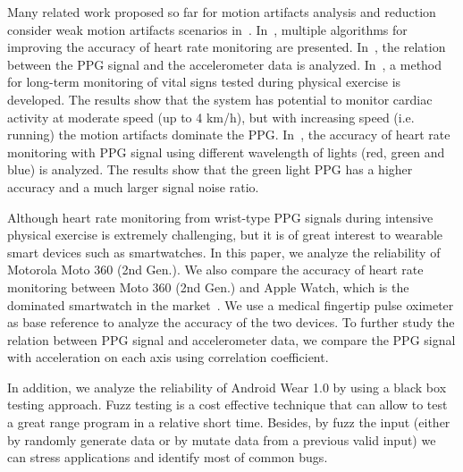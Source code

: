 \documentclass[11pt, draftclsnofoot, onecolumn]{IEEEtran}
\begin{document}
    Many related work proposed so far for motion artifacts analysis and reduction consider weak motion artifacts scenarios in~\cite{couceiro2014detection, kim2007adaptive, santos2012accelerometer, lee2013comparison}. In~\cite{couceiro2014detection}, multiple algorithms for improving the accuracy of heart rate monitoring are presented. In~\cite{kim2007adaptive}, the relation between the PPG signal and the accelerometer data is analyzed. In~\cite{santos2012accelerometer}, a method for long-term monitoring of vital signs tested during physical exercise is developed. The results show that the system has potential to monitor cardiac activity at moderate speed (up to 4 km/h), but with increasing speed (i.e. running) the motion artifacts dominate the PPG. In~\cite{lee2013comparison}, the accuracy of heart rate monitoring with PPG signal using different wavelength of lights (red, green and blue) is analyzed. The results show that the green light PPG has a higher accuracy and a much larger signal noise ratio. 
    
    Although heart rate monitoring from wrist-type PPG signals during intensive physical exercise is extremely challenging, but it is of great interest to wearable smart devices such as smartwatches. In this paper, we analyze the reliability of Motorola Moto 360 (2nd Gen.). We also compare the accuracy of heart rate monitoring between Moto 360 (2nd Gen.) and Apple Watch, which is the dominated smartwatch in the market~\cite{IDC2016WearableQ3}. We use a  medical fingertip pulse oximeter as base reference to analyze the accuracy of the  two  devices. To further study the relation between PPG signal and accelerometer data, we compare the PPG signal with acceleration on each axis using correlation coefficient.
    
    In addition, we analyze the reliability of Android Wear 1.0 by using a black box testing approach. Fuzz testing is a cost effective technique that can allow to test a great range program in a relative short time. Besides, by fuzz the input (either by randomly generate data or by mutate data from a previous valid input) we can stress applications and identify most of common bugs. 
    
    
\end{document}
